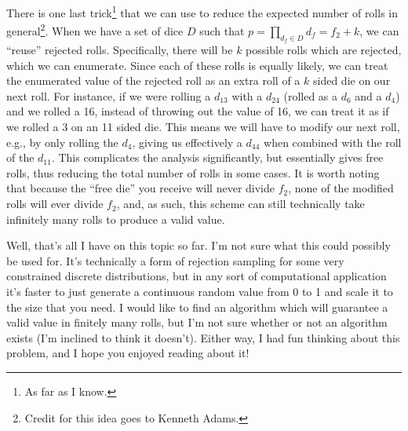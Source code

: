 \documentclass{article}
\begin{document}
\par There is one last trick\footnote{As far as I know.} that we can use to reduce the expected number of rolls in general\footnote{Credit for this idea goes to Kenneth Adams.}.
When we have a set of dice $D$ such that $p = \prod_{d_f\in D}d_f = f_2 + k$, we can ``reuse'' rejected rolls.
Specifically, there will be $k$ possible rolls which are rejected, which we can enumerate.
Since each of these rolls is equally likely, we can treat the enumerated value of the rejected roll as an extra roll of a $k$ sided die on our next roll.
For instance, if we were rolling a $d_{13}$ with a $d_{24}$ (rolled as a $d_6$ and a $d_4$) and we rolled a 16, instead of throwing out the value of 16, we can treat it as if we rolled a 3 on an 11 sided die.
This means we will have to modify our next roll, e.g., by only rolling the $d_4$, giving us effectively a $d_{44}$ when combined with the roll of the $d_{11}$.
This complicates the analysis significantly, but essentially gives free rolls, thus reducing the total number of rolls in some cases.
It is worth noting that because the ``free die'' you receive will never divide $f_2$, none of the modified rolls will ever divide $f_2$, and, as such, this scheme can still technically take infinitely many rolls to produce a valid value.

\par Well, that's all I have on this topic so far. 
I'm not sure what this could possibly be used for.
It's technically a form of rejection sampling for some very constrained discrete distributions, but in any sort of computational application it's faster to just generate a continuous random value from 0 to 1 and scale it to the size that you need.
I would like to find an algorithm which will guarantee a valid value in finitely many rolls, but I'm not sure whether or not an algorithm exists (I'm inclined to think it doesn't).
Either way, I had fun thinking about this problem, and I hope you enjoyed reading about it!
\end{document}
